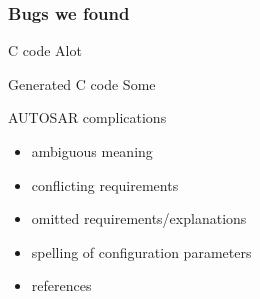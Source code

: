 \documentclass{beamer}
\begin{document}
\begin{frame}
  \frametitle{Bugs we found}
  \begin{block}{C code}
    Alot
  \end{block}

  \begin{block}{Generated C code}
    Some
  \end{block}

  \begin{block}{AUTOSAR complications}
    \begin{itemize}
      \item ambiguous meaning
      \item conflicting requirements
      \item omitted requirements/explanations
      \item spelling of configuration parameters
      \item references
    \end{itemize}
  \end{block}

\end{frame}

\end{document}
